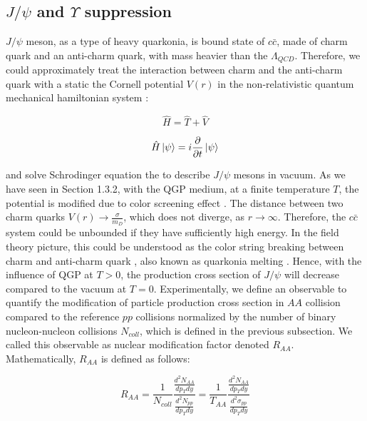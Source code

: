 \subsection{$J/\psi$ and $\Upsilon$ suppression} 

$J/\psi$ meson, as a type of heavy quarkonia, is bound state of $c\bar c$, made of charm quark and an anti-charm quark, with mass heavier than the $\Lambda_{QCD}$. Therefore, we could approximately treat the interaction between charm and the anti-charm quark with a static the Cornell potential $V(r)$ in the non-relativistic quantum mechanical hamiltonian system \cite{QuarkoniaV}: 

\begin{equation}
\hat H = \hat T + \hat V
\end{equation}

\begin{equation}
\hat H \ket{\psi} = i \frac{\partial}{\partial t}  \ket{\psi} 
\end{equation}

and solve Schrodinger equation the to describe $J/\psi$ mesons in vacuum. As we have seen in Section 1.3.2, with the QGP medium, at a finite temperature $T$, the potential is modified due to color screening effect \cite{QCDString}. The distance between two charm quarks $V(r) \rightarrow \frac{\sigma}{m_D}$, which does not diverge, as $r \rightarrow \infty$. Therefore, the $c \bar c$ system could be unbounded if they have sufficiently high energy. In the field theory picture, this could be understood as the color string breaking between charm and anti-charm quark \cite{CSBQQ}, also known as quarkonia melting \cite{QQMelt}. Hence, with the influence of QGP at $T > 0$, the production cross section of $J/\psi$ will decrease compared to the vacuum at $T=0$. Experimentally, we define an observable to quantify the modification of particle production cross section in $AA$ collision compared to the reference $pp$ collisions normalized by the number of binary nucleon-nucleon collisions $N_{coll}$, which is defined in the previous subsection. We called this observable as nuclear modification factor denoted $R_{AA}$. Mathematically, $R_{AA}$ is defined as follows:

\begin{equation}
R_{AA} =\frac{1}{N_{coll}} \frac{\frac{d^2N_{AA}}{dp_T dy}}{\frac{d^2N_{pp}}{dp_T dy}} = \frac{1}{T_{AA}} \frac{\frac{d^2N_{AA}}{dp_T dy}}{\frac{d^2\sigma_{pp}}{dp_T dy}}
\end{equation}

